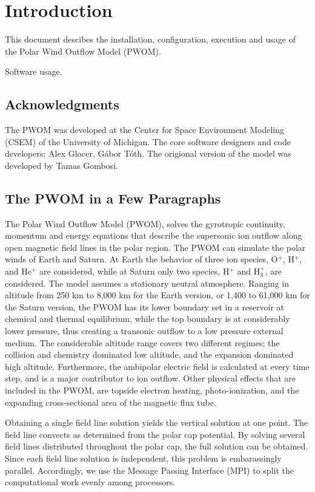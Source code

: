 
\chapter{Introduction}

This document descibes the installation, configuration, execution and 
usage of the Polar Wind Outflow Model (PWOM).

Software usage.

\section{Acknowledgments}

The PWOM was developed at the Center for Space Environment Modeling
(CSEM) of the University of Michigan. 
The core software designers and code developers: Alex Glocer, G\'abor T\'oth. 
The origional version of the model was developed by Tamas Gombosi.

\section{The PWOM in a Few Paragraphs}

The Polar Wind Outflow Model (PWOM), solves the gyrotropic continuity, 
momentum and energy equations that describe the supersonic ion outflow 
along open magnetic field lines in the polar region. The PWOM can simulate 
the polar winds of Earth and Saturn. At Earth the behavior of three ion 
species, O$^{+}$, H$^{+}$, and He$^{+}$ are considered, while at Saturn 
only two species, H$^{+}$ and H$_{3}^{+}$, are considered. The model assumes 
a stationary neutral atmosphere. Ranging in altitude from 250 km to 8,000 km 
for the Earth version, or 1,400 to 61,000 km for the Saturn version, the PWOM 
has its lower boundary set in a reservoir at chemical and thermal equilibrium, 
while the top boundary is at considerably lower pressure, thus creating a 
transonic outflow to a low pressure external medium. The considerable 
altitude range covers two different regimes; the collision and chemistry 
dominated low altitude, and the expansion dominated high altitude. 
Furthermore, the ambipolar electric field is calculated at every time step, 
and is a major contributor to ion outflow. Other physical effects that are 
included in the PWOM, are topside electron heating, photo-ionization, and the 
expanding cross-sectional area of the magnetic flux tube.

Obtaining a single field line solution yields the vertical solution at one 
point. The field line convects as determined from the polar cap potential. 
By solving several field lines distributed  throughout the polar cap, 
the full solution can be obtained. Since each field line solution is 
independent, this problem is embarassingly parallel. Accordingly, 
we use the Message Passing Interface (MPI) to split the computational work 
evenly among processors. 

